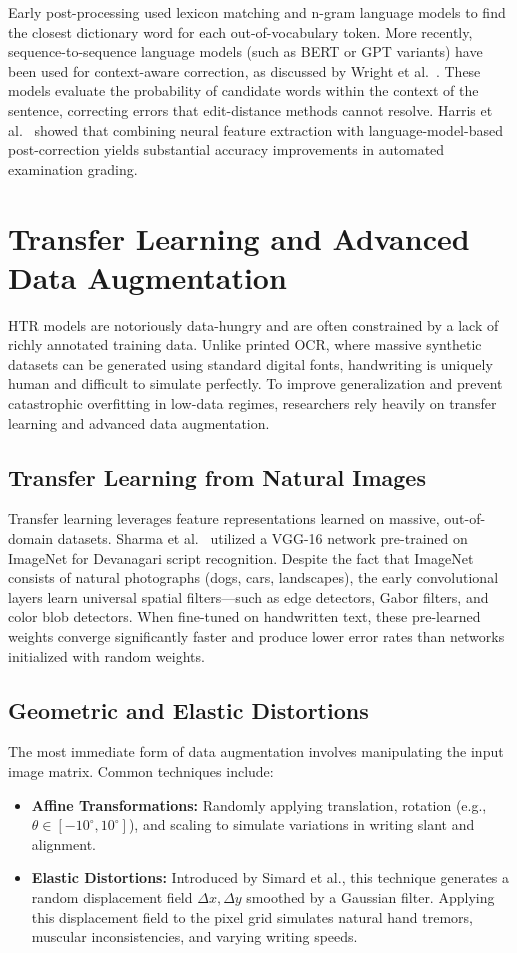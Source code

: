 Early post-processing used lexicon matching and n-gram language models to find the closest dictionary word for each out-of-vocabulary token. More recently, sequence-to-sequence language models (such as BERT or GPT variants) have been used for context-aware correction, as discussed by Wright et al.~\cite{study2025nlp}. These models evaluate the probability of candidate words within the context of the sentence, correcting errors that edit-distance methods cannot resolve. Harris et al.~\cite{study2025multimodal} showed that combining neural feature extraction with language-model-based post-correction yields substantial accuracy improvements in automated examination grading.

\section{Transfer Learning and Advanced Data Augmentation}
HTR models are notoriously data-hungry and are often constrained by a lack of richly annotated training data. Unlike printed OCR, where massive synthetic datasets can be generated using standard digital fonts, handwriting is uniquely human and difficult to simulate perfectly. To improve generalization and prevent catastrophic overfitting in low-data regimes, researchers rely heavily on transfer learning and advanced data augmentation.

\subsection{Transfer Learning from Natural Images}
Transfer learning leverages feature representations learned on massive, out-of-domain datasets. Sharma et al.~\cite{study2024devanagari} utilized a VGG-16 network pre-trained on ImageNet for Devanagari script recognition. Despite the fact that ImageNet consists of natural photographs (dogs, cars, landscapes), the early convolutional layers learn universal spatial filters—such as edge detectors, Gabor filters, and color blob detectors. When fine-tuned on handwritten text, these pre-learned weights converge significantly faster and produce lower error rates than networks initialized with random weights.

\subsection{Geometric and Elastic Distortions}
The most immediate form of data augmentation involves manipulating the input image matrix. Common techniques include:
\begin{itemize}
    \item \textbf{Affine Transformations:} Randomly applying translation, rotation (e.g., $\theta \in [-10^\circ, 10^\circ]$), and scaling to simulate variations in writing slant and alignment.
    \item \textbf{Elastic Distortions:} Introduced by Simard et al., this technique generates a random displacement field $\Delta x, \Delta y$ smoothed by a Gaussian filter. Applying this displacement field to the pixel grid simulates natural hand tremors, muscular inconsistencies, and varying writing speeds.
\end{itemize}

